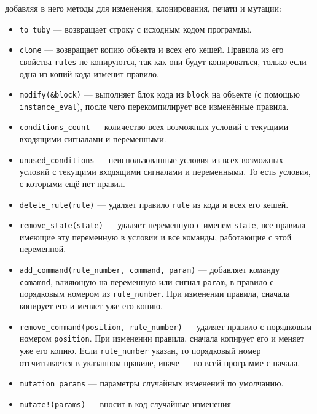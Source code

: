 \documentclass[utf8,a5paper,portrait,10pt,twoside]{eskdtext}
\begin{document}
\begin{itemize}
       добавляя в него методы для изменения, клонирования, печати и мутации:
       \begin{itemize}
         \item \texttt{to\_tuby} — возвращает строку с исходным кодом программы.
         \item \texttt{clone} — возвращает копию объекта и всех его кешей.
               Правила из его свойства \texttt{rules} не копируются, так как они
               будут копироваться, только если одна из копий кода изменит
               правило.
         \item \texttt{modify(\&block)} — выполняет блок кода из \texttt{block}
               на объекте (с помощью \texttt{instance\_eval}), после чего
               перекомпилирует все изменённые правила.
         \item \texttt{conditions\_count} — количество всех возможных условий
               с текущими входящими сигналами и переменными.
         \item \texttt{unused\_conditions} — неиспользованные условия из
               всех возможных условий с текущими входящими сигналами и
               переменными. То есть условия, с которыми ещё нет правил.
         \item \texttt{delete\_rule(rule)} — удаляет правило \texttt{rule} из
               кода и всех его кешей.
         \item \texttt{remove\_state(state)} — удаляет переменную с именем
               \texttt{state}, все правила имеющие эту переменную в условии и
               все команды, работающие с этой переменной.
         \item \texttt{add\_command(rule\_number, command, param)} — добавляет
               команду \texttt{comamnd}, влияющую на переменную или сигнал
               \texttt{param}, в правило с порядковым номером из
               \texttt{rule\_number}. При изменении правила, сначала копирует
               его и меняет уже его копию.
         \item \texttt{remove\_command(position, rule\_number)} — удаляет
               правило с порядковым номером \texttt{position}. При изменении
               правила, сначала копирует его и меняет уже его копию. Если
               \texttt{rule\_number} указан, то порядковый номер отсчитывается
               в указанном правиле, иначе — во всей программе с начала.
         \item \texttt{mutation\_params} — параметры случайных изменений по
               умолчанию.
         \item \texttt{mutate!(params)} — вносит в код случайные изменения

\end{itemize}
\end{itemize}
\end{document}
